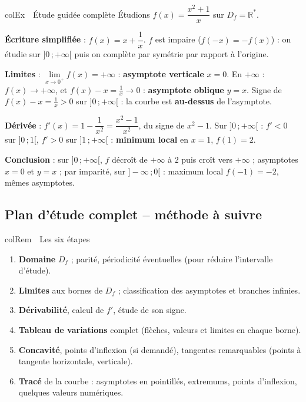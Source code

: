 \documentclass[11pt,a4paper]{article}
\newenvironment{exemple}[1][Exemple]
  {\begin{fiche}{colEx}{\ding{217}~~#1}}{\end{fiche}}
\newenvironment{remarque}[1][Remarque]
  {\begin{fiche}{colRem}{\ding{43}~~#1}}{\end{fiche}}
\begin{document}
\begin{exemple}[Étude guidée complète]
Étudions $f(x) = \dfrac{x^2 + 1}{x}$ sur $D_f = \mathbb{R}^*$.

\smallskip
\textbf{Écriture simplifiée} : $f(x) = x + \dfrac{1}{x}$. $f$ est impaire ($f(-x) = -f(x)$) : on étudie sur $]0\,;+\infty[$ puis on complète par symétrie par rapport à l'origine.

\smallskip
\textbf{Limites} : $\lim\limits_{x \to 0^+} f(x) = +\infty$ : \textbf{asymptote verticale} $x = 0$. En $+\infty$ : $f(x) \to +\infty$, et $f(x) - x = \frac{1}{x} \to 0$ : \textbf{asymptote oblique} $y = x$. Signe de $f(x) - x = \frac{1}{x} > 0$ sur $]0\,;+\infty[$ : la courbe est \textbf{au-dessus} de l'asymptote.

\smallskip
\textbf{Dérivée} : $f'(x) = 1 - \dfrac{1}{x^2} = \dfrac{x^2 - 1}{x^2}$, du signe de $x^2 - 1$. Sur $]0\,;+\infty[$ : $f' < 0$ sur $]0\,;1[$, $f' > 0$ sur $]1\,;+\infty[$ : \textbf{minimum local} en $x = 1$, $f(1) = 2$.

\smallskip
\textbf{Conclusion} : sur $]0\,;+\infty[$, $f$ décroît de $+\infty$ à $2$ puis croît vers $+\infty$ ; asymptotes $x = 0$ et $y = x$ ; par imparité, sur $]-\infty\,;0[$ : maximum local $f(-1) = -2$, mêmes asymptotes.
\end{exemple}

\subsection{Plan d'étude complet -- méthode à suivre}

\begin{remarque}[Les six étapes]
\begin{enumerate}[leftmargin=7mm, itemsep=0.5mm]
  \item \textbf{Domaine} $D_f$ ; parité, périodicité éventuelles (pour réduire l'intervalle d'étude).
  \item \textbf{Limites} aux bornes de $D_f$ ; classification des asymptotes et branches infinies.
  \item \textbf{Dérivabilité}, calcul de $f'$, étude de son signe.
  \item \textbf{Tableau de variations} complet (flèches, valeurs et limites en chaque borne).
  \item \textbf{Concavité}, points d'inflexion (si demandé), tangentes remarquables (points à tangente horizontale, verticale).
  \item \textbf{Tracé} de la courbe : asymptotes en pointillés, extremums, points d'inflexion, quelques valeurs numériques.
\end{enumerate}
\end{remarque}
\end{document}
